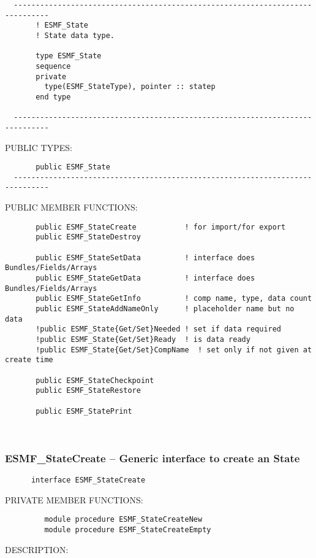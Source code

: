 \begin{verbatim}
  ------------------------------------------------------------------------------
       ! ESMF_State
       ! State data type.
 
       type ESMF_State
       sequence
       private
         type(ESMF_StateType), pointer :: statep
       end type
 
  ------------------------------------------------------------------------------\end{verbatim}{\sf PUBLIC TYPES:}
\begin{verbatim}       public ESMF_State
  ------------------------------------------------------------------------------
 \end{verbatim}{\sf PUBLIC MEMBER FUNCTIONS:}
\begin{verbatim} 
       public ESMF_StateCreate           ! for import/for export
       public ESMF_StateDestroy
 
       public ESMF_StateSetData          ! interface does Bundles/Fields/Arrays
       public ESMF_StateGetData          ! interface does Bundles/Fields/Arrays
       public ESMF_StateGetInfo          ! comp name, type, data count
       public ESMF_StateAddNameOnly      ! placeholder name but no data
       !public ESMF_State{Get/Set}Needed ! set if data required
       !public ESMF_State{Get/Set}Ready  ! is data ready
       !public ESMF_State{Get/Set}CompName  ! set only if not given at create time
  
       public ESMF_StateCheckpoint
       public ESMF_StateRestore
  
       public ESMF_StatePrint\end{verbatim}
 
 
\mbox{}\hrulefill\ 
 
\subsubsection{ESMF\_StateCreate -- Generic interface to create an State}


 
\begin{verbatim}      interface ESMF_StateCreate
 \end{verbatim}{\sf PRIVATE MEMBER FUNCTIONS:}
\begin{verbatim}         module procedure ESMF_StateCreateNew
         module procedure ESMF_StateCreateEmpty
 \end{verbatim}
{\sf DESCRIPTION:\\ }

